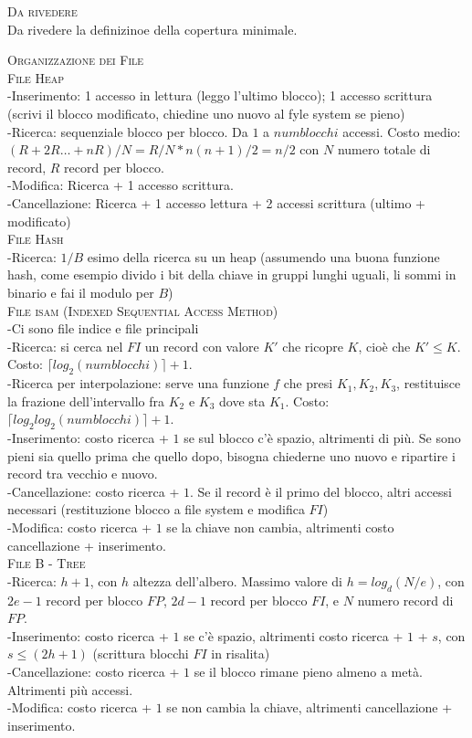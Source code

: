 \documentclass[a4paper,10pt]{article} %
\newcommand{\mtheorem}[1]{%
    {\hspace*{-10pt} \textsc {#1}}}
\newcommand{\msection}[1]{%
    {\normalsize \textsc {#1}\\[1ex]}}
\begin{document}
\bigskip

\msection{Da rivedere}
    Da rivedere la definizinoe della copertura minimale.

\bigskip

\msection{Organizzazione dei File}
    \mtheorem{File Heap}\\
        -Inserimento: 1 accesso in lettura (leggo l'ultimo blocco); 1 accesso scrittura (scrivi il blocco modificato, chiedine uno nuovo al fyle system se pieno)\\
        -Ricerca: sequenziale blocco per blocco. Da $1$ a $num blocchi$ accessi. Costo medio: $(R + 2R \ldots + nR)/N = R/N * n(n + 1) / 2 = n / 2$ con $N$ numero totale di record, $R$ record per blocco.\\
        -Modifica: Ricerca + 1 accesso scrittura.\\
        -Cancellazione: Ricerca + 1 accesso lettura + 2 accessi scrittura (ultimo + modificato)\\
    \mtheorem{File Hash}\\
        -Ricerca: $1/B$ esimo della ricerca su un heap (assumendo una buona funzione hash, come esempio divido i bit della chiave in gruppi lunghi uguali, li sommi in binario e fai il modulo per $B$)\\
    \mtheorem{File isam (Indexed Sequential Access Method)}\\
        -Ci sono file indice e file principali\\
        -Ricerca: si cerca nel $FI$ un record con valore $K'$ che ricopre $K$, cioè che $K' \leq K$. Costo: $\lceil log_2(num blocchi) \rceil + 1$.\\
        -Ricerca per interpolazione: serve una funzione $f$ che presi $K_1, K_2, K_3$, restituisce la frazione dell'intervallo fra $K_2$ e $K_3$ dove sta $K_1$. Costo: $\lceil log_2 log_2(numblocchi) \rceil + 1$.\\
        -Inserimento: costo ricerca + $1$ se sul blocco c'è spazio, altrimenti di più. Se sono pieni sia quello prima che quello dopo, bisogna chiederne uno nuovo e ripartire i record tra vecchio e nuovo.\\
        -Cancellazione: costo ricerca + $1$. Se il record è il primo del blocco, altri accessi necessari (restituzione blocco a file system e modifica $FI$)\\
        -Modifica: costo ricerca + $1$ se la chiave non cambia, altrimenti costo cancellazione + inserimento.\\
    \mtheorem{File B - Tree}\\
        -Ricerca: $h + 1$, con $h$ altezza dell'albero. Massimo valore di $h = log_d(N/e)$, con $2e - 1$ record per blocco $FP$, $2d - 1$ record per blocco $FI$, e $N$ numero record di $FP$.\\
        -Inserimento: costo ricerca + $1$ se c'è spazio, altrimenti costo ricerca + $1$ + $s$, con $s \leq (2h + 1)$ (scrittura blocchi $FI$ in risalita)\\
        -Cancellazione: costo ricerca + $1$ se il blocco rimane pieno almeno a metà. Altrimenti più accessi.\\
        -Modifica: costo ricerca + $1$ se non cambia la chiave, altrimenti cancellazione + inserimento.
\end{document}
